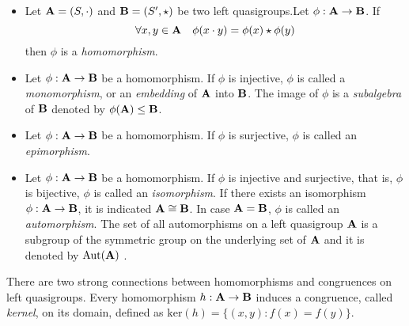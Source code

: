 \begin{definition} \cite{burris1981course}\label{automorphism}
\begin{itemize} 


    \item Let $\mathbf{A} = (S, \cdot)$ and $\mathbf{B}=(S',\star)$ be two left quasigroups.\newline Let $\phi : \mathbf{A} \to \mathbf{B}$.\newline
If 
\[\forall x,y \in \mathbf{A} \quad \phi(x\cdot y)= \phi(x)\star \phi(y)\]
then $\phi$ is a \emph{homomorphism}.

    \item Let $\phi : \mathbf{A} \to \mathbf{B}$ be a homomorphism. If $\phi$ is injective, $\phi$ is called a \emph{monomorphism}, or an \emph{embedding} of $\mathbf{A}$ into $\mathbf{B}$.  The image of $\phi$ is a \emph{subalgebra} of $\mathbf{B}$ denoted by $\phi(\mathbf{A}) \leq \mathbf{B}$. 
    

     \item Let $\phi : \mathbf{A} \to \mathbf{B}$ be a homomorphism. If $\phi$ is surjective, $\phi$ is called an \emph{epimorphism}. 
     
     \item Let $\phi : \mathbf{A} \to \mathbf{B}$ be a homomorphism. If $\phi$ is injective and surjective, that is, $\phi$ is bijective, $\phi$ is called an \emph{isomorphism}. \newline If there exists an isomorphism $\phi: \mathbf{A} \to \mathbf{B}$, it is indicated $\mathbf{A} \cong \mathbf{B}$.\newline
In case $\mathbf{A}=\mathbf{B}$, $\phi$ is called an \emph{automorphism}. \newline The set of all automorphisms on a left quasigroup $\mathbf{A}$ is a subgroup of the symmetric group on the underlying set of $\mathbf{A}$ and it is denoted by $\operatorname{Aut}(\mathbf{A})$ \cite{warner1990modern}.
\end{itemize}
\end{definition}
\noindent There are two strong connections between homomorphisms and congruences on left quasigroups. Every homomorphism $h : \mathbf{A} \to \mathbf{B}$ induces a congruence, called \emph{kernel}, on its domain, defined as $\text{ker}(h) = \{(x,y) : f(x) = f(y) \}$. \newline 

